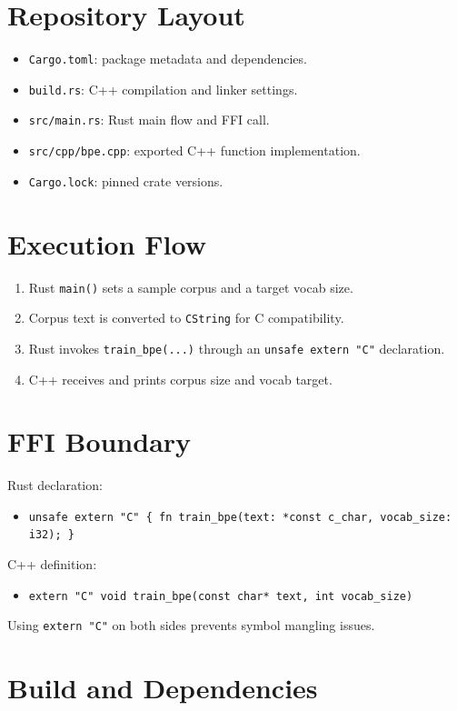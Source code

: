 \documentclass[11pt]{article}
\begin{document}
\section{Repository Layout}
\begin{itemize}[leftmargin=1.2em]
  \item \texttt{Cargo.toml}: package metadata and dependencies.
  \item \texttt{build.rs}: C++ compilation and linker settings.
  \item \texttt{src/main.rs}: Rust main flow and FFI call.
  \item \texttt{src/cpp/bpe.cpp}: exported C++ function implementation.
  \item \texttt{Cargo.lock}: pinned crate versions.
\end{itemize}

\section{Execution Flow}
\begin{enumerate}[leftmargin=1.5em]
  \item Rust \texttt{main()} sets a sample corpus and a target vocab size.
  \item Corpus text is converted to \texttt{CString} for C compatibility.
  \item Rust invokes \texttt{train\_bpe(...)} through an \texttt{unsafe extern "C"} declaration.
  \item C++ receives and prints corpus size and vocab target.
\end{enumerate}

\section{FFI Boundary}
Rust declaration:
\begin{itemize}[leftmargin=1.2em]
  \item \texttt{unsafe extern "C" \{ fn train\_bpe(text: *const c\_char, vocab\_size: i32); \}}
\end{itemize}
C++ definition:
\begin{itemize}[leftmargin=1.2em]
  \item \texttt{extern "C" void train\_bpe(const char* text, int vocab\_size)}
\end{itemize}
Using \texttt{extern "C"} on both sides prevents symbol mangling issues.

\section{Build and Dependencies}
\end{document}

